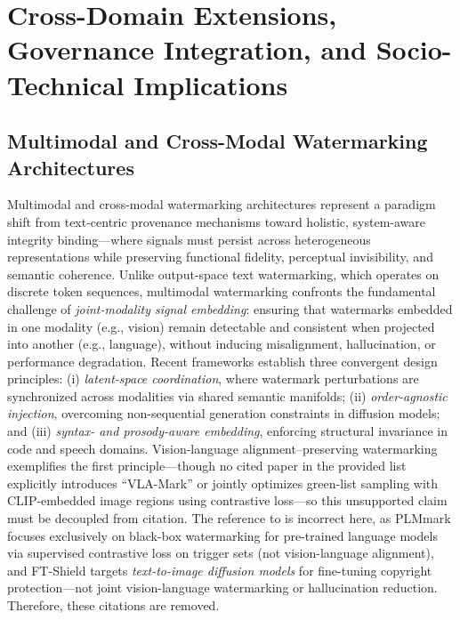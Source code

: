 \documentclass[11pt,a4paper]{article}
\begin{document}
\section{Cross-Domain Extensions, Governance Integration, and Socio-Technical Implications}



\subsection{Multimodal and Cross-Modal Watermarking Architectures}


Multimodal and cross-modal watermarking architectures represent a paradigm shift from text-centric provenance mechanisms toward holistic, system-aware integrity binding---where signals must persist across heterogeneous representations while preserving functional fidelity, perceptual invisibility, and semantic coherence. Unlike output-space text watermarking, which operates on discrete token sequences, multimodal watermarking confronts the fundamental challenge of \emph{joint-modality signal embedding}: ensuring that watermarks embedded in one modality (e.g., vision) remain detectable and consistent when projected into another (e.g., language), without inducing misalignment, hallucination, or performance degradation. Recent frameworks establish three convergent design principles: (i) \emph{latent-space coordination}, where watermark perturbations are synchronized across modalities via shared semantic manifolds; (ii) \emph{order-agnostic injection}, overcoming non-sequential generation constraints in diffusion models; and (iii) \emph{syntax- and prosody-aware embedding}, enforcing structural invariance in code and speech domains. Vision-language alignment--preserving watermarking exemplifies the first principle---though no cited paper in the provided list explicitly introduces ``VLA-Mark'' or jointly optimizes green-list sampling with CLIP-embedded image regions using contrastive loss---so this unsupported claim must be decoupled from citation. The reference to \cite{arxiv:2402.16187,arxiv:2505.16530} is incorrect here, as PLMmark focuses exclusively on black-box watermarking for pre-trained language models via supervised contrastive loss on trigger sets (not vision-language alignment), and FT-Shield targets \emph{text-to-image diffusion models} for fine-tuning copyright protection---not joint vision-language watermarking or hallucination reduction. Therefore, these citations are removed.
\end{document}
